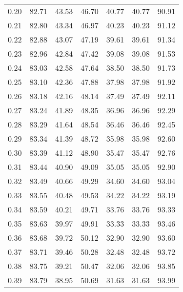 \begin{tabular}{|c|c|c|c|c|c|c|}
      0.20 &     82.71 &     43.53 &      46.70 &   40.77 &      40.77 &         90.91 \\
      0.21 &     82.80 &     43.34 &      46.97 &   40.23 &      40.23 &         91.12 \\
      0.22 &     82.88 &     43.07 &      47.19 &   39.61 &      39.61 &         91.34 \\
      0.23 &     82.96 &     42.84 &      47.42 &   39.08 &      39.08 &         91.53 \\
      0.24 &     83.03 &     42.58 &      47.64 &   38.50 &      38.50 &         91.73 \\
      0.25 &     83.10 &     42.36 &      47.88 &   37.98 &      37.98 &         91.92 \\
      0.26 &     83.18 &     42.16 &      48.14 &   37.49 &      37.49 &         92.11 \\
      0.27 &     83.24 &     41.89 &      48.35 &   36.96 &      36.96 &         92.29 \\
      0.28 &     83.29 &     41.64 &      48.54 &   36.46 &      36.46 &         92.45 \\
      0.29 &     83.34 &     41.39 &      48.72 &   35.98 &      35.98 &         92.60 \\
      0.30 &     83.39 &     41.12 &      48.90 &   35.47 &      35.47 &         92.76 \\
      0.31 &     83.44 &     40.90 &      49.09 &   35.05 &      35.05 &         92.90 \\
      0.32 &     83.49 &     40.66 &      49.29 &   34.60 &      34.60 &         93.04 \\
      0.33 &     83.55 &     40.48 &      49.53 &   34.22 &      34.22 &         93.19 \\
      0.34 &     83.59 &     40.21 &      49.71 &   33.76 &      33.76 &         93.33 \\
      0.35 &     83.63 &     39.97 &      49.91 &   33.33 &      33.33 &         93.46 \\
      0.36 &     83.68 &     39.72 &      50.12 &   32.90 &      32.90 &         93.60 \\
      0.37 &     83.71 &     39.46 &      50.28 &   32.48 &      32.48 &         93.72 \\
      0.38 &     83.75 &     39.21 &      50.47 &   32.06 &      32.06 &         93.85 \\
      0.39 &     83.79 &     38.95 &      50.69 &   31.63 &      31.63 &         93.99 \\

\end{tabular}
